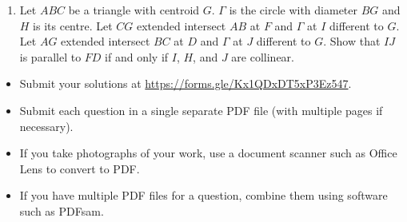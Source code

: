 \documentclass{article}
\begin{document}
\begin{enumerate}[1.]
\vfill
\item %
Let $ABC$ be a triangle with centroid $G$.
$\Gamma$ is the circle with diameter $BG$ and $H$ is its centre.
Let $CG$ extended intersect $AB$ at $F$ and $\Gamma$ at $I$ different to $G$.
Let $AG$ extended intersect $BC$ at $D$ and $\Gamma$ at $J$ different to $G$. Show that $IJ$ is parallel to $FD$ if and only if $I$, $H$, and $J$ are collinear.

\end{enumerate}


\vfill
\vfill

\begin{itemize}
	\item Submit your solutions at \url{https://forms.gle/Kx1QDxDT5xP3Ez547}.
	\item Submit each question in a single separate PDF file (with multiple pages if necessary).
	\item If you take photographs of your work, use a document scanner such as Office Lens to convert to PDF.
	\item If you have multiple PDF files for a question, combine them using software such as PDFsam.
\end{itemize}
\end{document}
